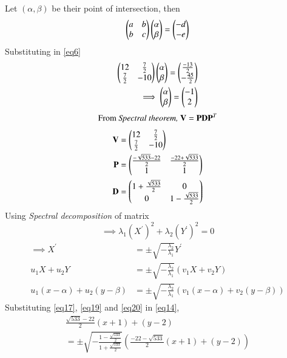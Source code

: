 \documentclass[journal,12pt,twocolumn]{IEEEtran}
\begin{document}
Let $(\alpha,\beta)$ be their point of intersection, then
\begin{equation}\label{eq6}
	\myvec{ a & b\\ b & c}\myvec{\alpha \\ \beta} = \myvec{-d \\ -e}
\end{equation}
Substituting in \eqref{eq6}
\begin{align}
	\label{eq16}\myvec{ 12 & \frac{7}{2}\\\frac{7}{2} & -10}\myvec{\alpha \\ \beta} = \myvec{\frac{-13}{2} \\ -\frac{45}{2}} \\
	\label{eq17}\implies \myvec{\alpha \\ \beta} = \myvec{-1 \\ 2}
\end{align}
\begin{equation}
	\text{From \textit{Spectral theorem, }}\vec{V} = \vec{P}\vec{D}\vec{P}^T
\end{equation}
\begin{align}
	\label{eq18}\vec{V} &= \myvec{ 12 & \frac{7}{2}\\ \frac{7}{2} & -10}\\
	\label{eq19}\vec{P} &= \myvec{\frac{-\sqrt{533} - 22}{2} & \frac{-22 + \sqrt{533}}{2}\\ 1 & 1}\\
	\label{eq20}\vec{D} &= \myvec{1 + \frac{\sqrt{533}}{2} & 0\\ 0 & 1 - \frac{\sqrt{533}}{2}}
\end{align}
Using \textit{Spectral decomposition} of matrix
\begin{equation}\label{eq13}
	\implies \lambda_1 (X^\prime)^2 + \lambda_2 (Y^\prime)^2 = 0
\end{equation}
\begin{align}
	\implies X^\prime &= \pm \sqrt{-\frac{\lambda_2}{\lambda_1}}Y^\prime\\	
	u_1X + u_2Y &= \pm \sqrt{-\frac{\lambda_2}{\lambda_1}}(v_1X + v_2Y)\\
	\label{eq14}u_1(x-\alpha) + u_2(y-\beta) &= \pm \sqrt{-\frac{\lambda_2}{\lambda_1}}(v_1(x-\alpha) + v_2(y-\beta))
\end{align}
Substituting \eqref{eq17}, \eqref{eq19} and \eqref{eq20} in \eqref{eq14},
\begin{multline}\label{eq21}
	\frac{\sqrt{533}-22}{2}(x+1) + (y-2) \\= \pm \sqrt{-\frac{1 - \frac{\sqrt{533}}{2}}{1 + \frac{\sqrt{533}}{2}}}\left(\frac{-22 -\sqrt{533}}{2}(x+1) + (y-2)\right)
\end{multline}
\end{document}
